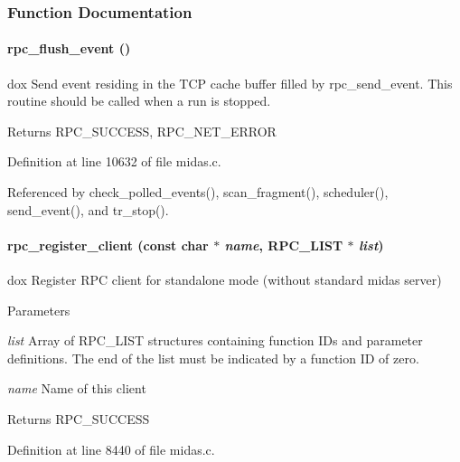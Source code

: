\subsubsection{Function Documentation}
\paragraph[{rpc\_\-flush\_\-event}]{ rpc\_\-flush\_\-event ()}\hfill\label{group__rpcfunctionc_ga83d80e4f1e8d2a2d7f38e58dcfd3c711}
dox Send event residing in the TCP cache buffer filled by rpc\_\-send\_\-event. This routine should be called when a run is stopped.

\begin{DoxyReturn}{Returns}
RPC\_\-SUCCESS, RPC\_\-NET\_\-ERROR 
\end{DoxyReturn}


Definition at line 10632 of file midas.c.

Referenced by check\_\-polled\_\-events(), scan\_\-fragment(), scheduler(), send\_\-event(), and tr\_\-stop().
\paragraph[{rpc\_\-register\_\-client}]{ rpc\_\-register\_\-client (const char $\ast$ {\em name}, \/  RPC\_\-LIST $\ast$ {\em list})}\hfill\label{group__rpcfunctionc_ga86593a38d88520b4cef9644b7fdc6d23}
dox Register RPC client for standalone mode (without standard midas server) 
\begin{DoxyParams}{Parameters}
\item[{\em list}]Array of RPC\_\-LIST structures containing function IDs and parameter definitions. The end of the list must be indicated by a function ID of zero. \item[{\em name}]Name of this client \end{DoxyParams}
\begin{DoxyReturn}{Returns}
RPC\_\-SUCCESS 
\end{DoxyReturn}


Definition at line 8440 of file midas.c.
